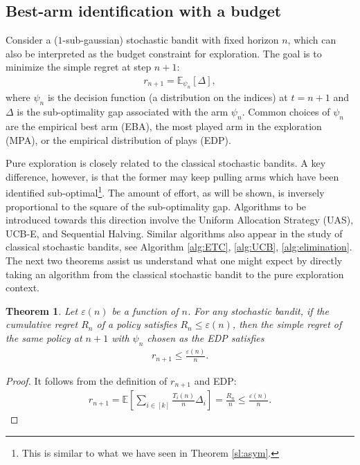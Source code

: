 \documentclass[letterpaper,10pt,openright,openany]{book}
\numberwithin{equation}{section}
\theoremstyle{plain}
\newtheorem{Th}{Theorem}[section]
\theoremstyle{definition}
\def\E{{\mathbb E}}
\def\e{{\varepsilon}}
\begin{document}
\subsection{Best-arm identification with a budget}

Consider a ($1$-sub-gaussian) stochastic bandit with fixed horizon $n$, which can also be interpreted as the budget constraint for exploration.  The goal is to minimize the simple regret at step $n+1$:
\begin{align*}
r_{n+1} = \E_{\psi_n}[\Delta],
\end{align*}
where $\psi_n$ is the decision function (a distribution on the indices) at $t=n+1$ and $\Delta$ is the sub-optimality gap associated with the arm $\psi_n$. Common choices of $\psi_n$ are the empirical best arm (EBA), the most played arm in the exploration (MPA), or the empirical distribution of plays (EDP). 

Pure exploration is closely related to the classical stochastic bandits. A key difference, however, is that the former may keep pulling arms which have been identified sub-optimal\footnote{This is similar to what we have seen in Theorem \ref{sl:asym}.}. The amount of effort, as will be shown, is inversely proportional to the square of the sub-optimality gap. Algorithms to be introduced towards this direction involve the Uniform Allocation Strategy (UAS),  UCB-E, and Sequential Halving. Similar algorithms also appear in the study of classical stochastic bandits, see Algorithm \ref{alg:ETC}, \ref{alg:UCB}, \ref{alg:elimination}. The next two theorems assist us understand what one might expect by directly taking an algorithm from the classical stochastic bandit to the pure exploration context. 


\begin{Th}
Let $\e(n)$ be a function of $n$. For any stochastic bandit, if the cumulative regret $R_n$ of a policy satisfies $R_n\leq\e(n)$, then the simple regret of the same policy at $n+1$ with $\psi_n$ chosen as the EDP satisfies \begin{align*}
r_{n+1}\leq \frac{\e(n)}{n}.
\end{align*}  
\end{Th}
\begin{proof}
It follows from the definition of $r_{n+1}$ and EDP:
\begin{align*}
r_{n+1}=\E\left[\sum_{i\in [k]}\frac{T_i(n)}{n}\Delta_i\right]=\frac{R_n}{n}\leq\frac{\e (n)}{n}. 
\end{align*}
\end{proof}
\end{document}
